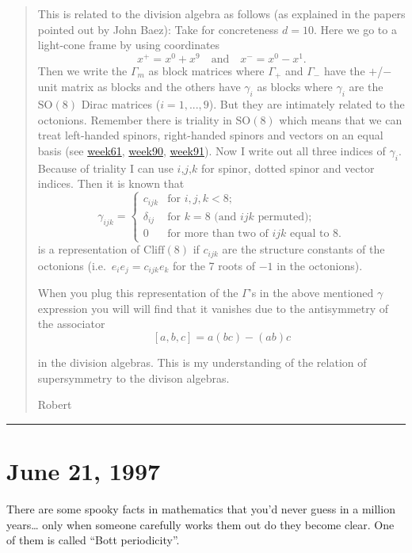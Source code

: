 \documentclass{article}
\begin{document}
\begin{quote}
This is related to the division algebra as follows (as explained in the
papers pointed out by John Baez): Take for concreteness \(d = 10\). Here
we go to a light-cone frame by using coordinates
\[x^+ = x^0 + x^9 \quad\text{and}\quad x^- = x^0 - x^1.\] Then we write
the \(\Gamma_m\) as block matrices where \(\Gamma_+\) and \(\Gamma_-\)
have the \(+\)/\(-\) unit matrix as blocks and the others have
\(\gamma_i\) as blocks where \(\gamma_i\) are the \(\mathrm{SO}(8)\)
Dirac matrices (\(i=1,...,9\)). But they are intimately related to the
octonions. Remember there is triality in \(\mathrm{SO}(8)\) which means
that we can treat left-handed spinors, right-handed spinors and vectors
on an equal basis (see \href{week61.html}{week61},
\href{week90.html}{week90}, \href{week91.html}{week91}). Now I write out
all three indices of \(\gamma_i\). Because of triality I can use
\(i\),\(j\),\(k\) for spinor, dotted spinor and vector indices. Then it
is known that \[
  \gamma_{ijk} =
  \begin{cases}
    c_{ijk} &\mbox{for $i,j,k<8$;}
  \\\delta_{ij} &\mbox{for $k=8$ (and $ijk$ permuted);}
  \\0 &\mbox{for more than two of $ijk$ equal to $8$.}
  \end{cases}
\] is a representation of \(\mathrm{Cliff}(8)\) if \(c_{ijk}\) are the
structure constants of the octonions (i.e.~\(e_i e_j = c_{ijk} e_k\) for
the 7 roots of \(-1\) in the octonions).

When you plug this representation of the \(\Gamma\)'s in the above
mentioned \(\gamma\) expression you will will find that it vanishes due
to the antisymmetry of the associator \[[a,b,c] = a(bc) - (ab)c\]

in the division algebras. This is my understanding of the relation of
supersymmetry to the divison algebras.

Robert
\end{quote}

\begin{center}\rule{0.5\linewidth}{0.5pt}\end{center}
\hypertarget{week105}{%
\section{June 21, 1997}\label{week105}}

There are some spooky facts in mathematics that you'd never guess in a
million years\ldots{} only when someone carefully works them out do they
become clear. One of them is called ``Bott periodicity''.
\end{document}
